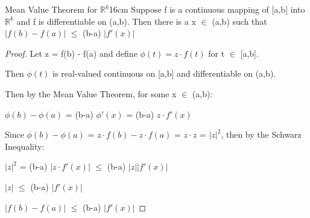    \begin{wtheorem}{Mean Value Theorem for $\mathbb{R}^k$}{16cm}
        Suppose f is a continuous mapping of [a,b] into $\mathbb{R}^k$
        and f is differentiable on (a,b). Then there is a x $\in$ (a,b)
        such that $|f(b) - f(a)|$ $\leq$ (b-a) $|f'(x)|$        
    \end{wtheorem}

    \begin{proof}
        Let z = f(b) - f(a) and define $\phi(t) = z \cdot f(t)$
        for t $\in$ [a,b].

        Then $\phi(t)$ is real-valued continuous on [a,b]
        and differentiable on (a,b).

        Then by the Mean Value Theorem, for some x $\in$ (a,b):

        \hspace{0.5cm}
        $\phi(b) - \phi(a)$
        = (b-a) $\phi'(x)$
        = (b-a) $z \cdot f'(x)$

        Since $\phi(b) - \phi(a)$
        = $z \cdot f(b) - z \cdot f(a)$
        = $z \cdot z$ = $|z|^2$,
        then by the Schwarz Inequality:
        
        \hspace{0.5cm}
        $|z|^2$
        = (b-a) $|z \cdot f'(x)|$
        $\leq$ (b-a) $|z| |f'(x)|$
        
        \hspace{0.5cm}
        $|z|$
        $\leq$ (b-a) $|f'(x)|$

        \hspace{0.5cm}
        $|f(b) - f(a)|$
        $\leq$ (b-a) $|f'(x)|$
    \end{proof}




